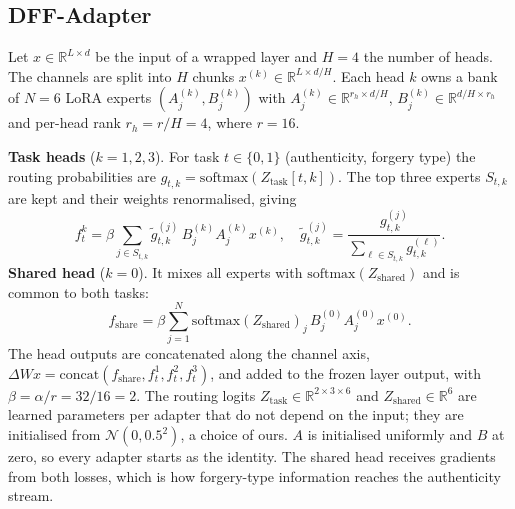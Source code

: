 \documentclass[lettersize,journal]{IEEEtran}
\begin{document}
\subsection{DFF-Adapter}
Let $x\in\mathbb{R}^{L\times d}$ be the input of a wrapped layer and $H{=}4$ the number of heads. The channels are split into $H$ chunks $x^{(k)}\in\mathbb{R}^{L\times d/H}$. Each head $k$ owns a bank of $N{=}6$ LoRA experts $(A_j^{(k)},B_j^{(k)})$ with $A_j^{(k)}\in\mathbb{R}^{r_h\times d/H}$, $B_j^{(k)}\in\mathbb{R}^{d/H\times r_h}$ and per-head rank $r_h=r/H=4$, where $r=16$.

\textbf{Task heads} ($k=1,2,3$). For task $t\in\{0,1\}$ (authenticity, forgery type) the routing probabilities are $g_{t,k}=\mathrm{softmax}(Z_{\mathrm{task}}[t,k])$. The top three experts $S_{t,k}$ are kept and their weights renormalised, giving
\begin{equation}
f_t^{k}=\beta\sum_{j\in S_{t,k}}\tilde g_{t,k}^{(j)}\,B_j^{(k)}A_j^{(k)}x^{(k)},\quad
\tilde g_{t,k}^{(j)}=\frac{g_{t,k}^{(j)}}{\sum_{\ell\in S_{t,k}}g_{t,k}^{(\ell)}}.
\label{eq:task}
\end{equation}
\textbf{Shared head} ($k=0$). It mixes all experts with $\mathrm{softmax}(Z_{\mathrm{shared}})$ and is common to both tasks:
\begin{equation}
f_{\mathrm{share}}=\beta\sum_{j=1}^{N}\mathrm{softmax}(Z_{\mathrm{shared}})_j\,B_j^{(0)}A_j^{(0)}x^{(0)}.
\label{eq:shared}
\end{equation}
The head outputs are concatenated along the channel axis, $\Delta Wx=\mathrm{concat}(f_{\mathrm{share}},f_t^{1},f_t^{2},f_t^{3})$, and added to the frozen layer output, with $\beta=\alpha/r=32/16=2$. The routing logits $Z_{\mathrm{task}}\in\mathbb{R}^{2\times3\times6}$ and $Z_{\mathrm{shared}}\in\mathbb{R}^{6}$ are learned parameters per adapter that do not depend on the input; they are initialised from $\mathcal{N}(0,0.5^2)$, a choice of ours. $A$ is initialised uniformly and $B$ at zero, so every adapter starts as the identity. The shared head receives gradients from both losses, which is how forgery-type information reaches the authenticity stream.
\end{document}
